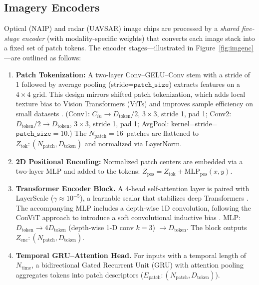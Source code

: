 \documentclass[12pt]{report}
\begin{document}
\subsection{Imagery Encoders}
\label{sec:img_enc}




Optical (NAIP) and radar (UAVSAR) image chips are processed by a \emph{shared five-stage encoder} (with modality-specific weights) that converts each image stack into a fixed set of patch tokens. The encoder stages—illustrated in Figure~\ref{fig:imgenc}—are outlined as follows:

\begin{enumerate}[leftmargin=*]
\item \textbf{Patch Tokenization:}
      A two-layer Conv–GELU–Conv stem with a stride of 1
      followed by average pooling (stride=$\texttt{patch\_size}$) extracts features on a $4\times4$ grid. This design mirrors shifted patch tokenization, which adds local texture bias to Vision Transformers (ViTs) and improves sample efficiency on small datasets \citep{lee2021vision}.
 (Conv1: $C_{in}\rightarrow D_{\text{token}}/2$, $3\times3$, stride 1, pad 1; Conv2: $D_{\text{token}}/2\rightarrow D_{\text{token}}$, $3\times3$, stride 1, pad 1; AvgPool: kernel=stride=$\texttt{patch\_size}=10$.) The \mbox{$N_{\text{patch}}=16$ patches} are flattened to $Z_{\text{tok}}: (N_{\text{patch}}, D_{\text{token}})$ and normalized via LayerNorm.


\item \textbf{2D Positional Encoding:}
      Normalized patch centers are embedded via a two-layer MLP and added to the tokens: $Z_{\text{pos}} = Z_{\text{tok}} + \text{MLP}_{\text{pos}}(x,y)$.

\item \textbf{Transformer Encoder Block.}
      A 4-head self-attention layer is paired with LayerScale ($\gamma \approx 10^{-5}$), a learnable scalar that stabilizes deep Transformers \citep{touvron2021going}. The accompanying MLP includes a depth-wise 1D convolution, following the ConViT approach to introduce a soft convolutional inductive bias \citep{dascoli2021convit}. MLP: $D_{\text{token}} \rightarrow 4 D_{\text{token}}$ (depth-wise 1-D conv $k=3$) $\rightarrow D_{\text{token}}$. The block outputs $Z_{\text{enc}}: (N_{\text{patch}}, D_{\text{token}})$.



\item \textbf{Temporal GRU–Attention Head.}
      For inputs with a temporal length of $N_{\text{time}}$, a bidirectional Gated Recurrent Unit (GRU) with attention pooling aggregates tokens into patch descriptors ($E_{\text{patch}}: (N_{\text{patch}}, D_{\text{token}})$).
\end{enumerate}
\end{document}
